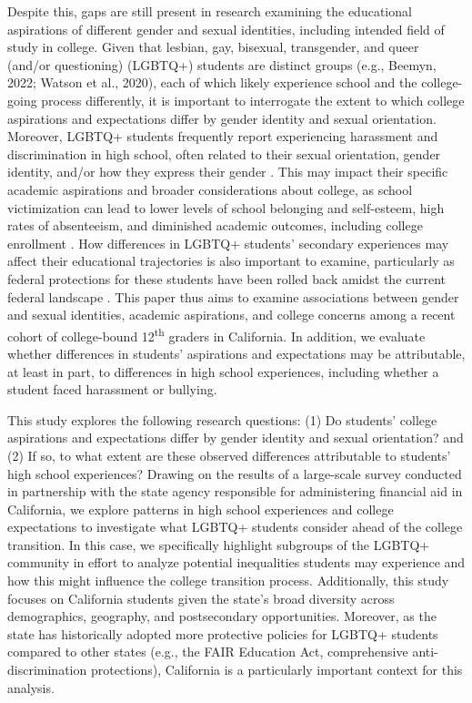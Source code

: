 Despite this, gaps are still present in research examining the
educational aspirations of different gender and sexual identities,
including intended field of study in college. Given that lesbian, gay,
bisexual, transgender, and queer (and/or questioning) (LGBTQ+) students
are distinct groups (e.g., Beemyn, 2022; Watson et al., 2020), each of
which likely experience school and the college-going process
differently, it is important to interrogate the extent to which college
aspirations and expectations differ by gender identity and sexual
orientation. Moreover, LGBTQ+ students frequently report experiencing
harassment and discrimination in high school, often related to their
sexual orientation, gender identity, and/or how they express their
gender \citep{kosciw2022a}. This may impact their specific academic
aspirations and broader considerations about college, as school
victimization can lead to lower levels of school belonging and
self-esteem, high rates of absenteeism, and diminished academic
outcomes, including college enrollment \citep{aragon2014a, heck2014a, sansone2019a}. How differences in LGBTQ+ students' secondary
experiences may affect their educational trajectories is also important
to examine, particularly as federal protections for these students have
been rolled back amidst the current federal landscape \citep{schultz2025a}.
This paper thus aims to examine associations between gender and sexual
identities, academic aspirations, and college concerns among a recent
cohort of college-bound 12\textsuperscript{th} graders in California. In addition, we
evaluate whether differences in students' aspirations and expectations
may be attributable, at least in part, to differences in high school
experiences, including whether a student faced harassment or bullying.

This study explores the following research questions: (1) Do students'
college aspirations and expectations differ by gender identity and
sexual orientation? and (2) If so, to what extent are these observed
differences attributable to students' high school experiences? Drawing
on the results of a large-scale survey conducted in partnership with the
state agency responsible for administering financial aid in California,
we explore patterns in high school experiences and college expectations
to investigate what LGBTQ+ students consider ahead of the college
transition. In this case, we specifically highlight subgroups of the
LGBTQ+ community in effort to analyze potential inequalities students
may experience and how this might influence the college transition
process. Additionally, this study focuses on California students given
the state's broad diversity across demographics, geography, and
postsecondary opportunities. Moreover, as the state has historically
adopted more protective policies for LGBTQ+ students compared to other
states (e.g., the FAIR Education Act, comprehensive anti-discrimination
protections), California is a particularly important context for this
analysis.

